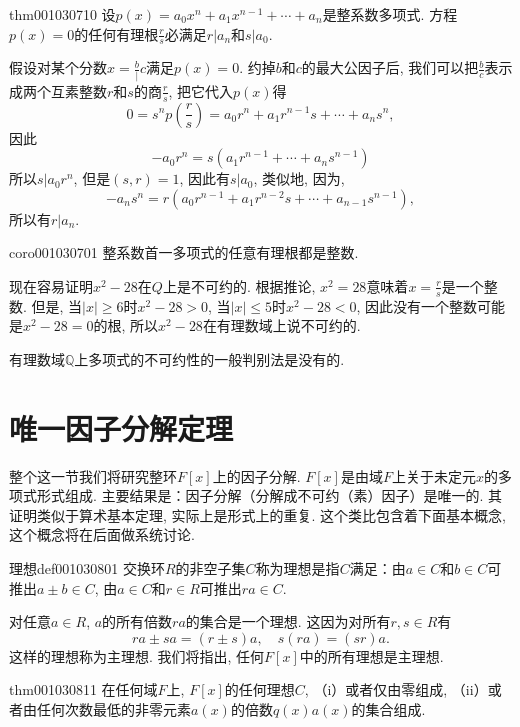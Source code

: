 \begin{theorem}{}{thm001030710}
设$p(x)=a_0x^n+a_1x^{n-1}+\cdots+a_n$是整系数多项式. 方程$p(x)=0$的任何有理根$\frac{r}{s}$必满足$r|a_n$和$s|a_0$. 
\end{theorem}

假设对某个分数$x=\frac{b}|{c}$满足$p(x)=0$. 约掉$b$和$c$的最大公因子后, 我们可以把$\frac{b}{c}$表示成两个互素整数$r$和$s$的商$\frac{r}{s}$, 把它代入$p(x)$得
\begin{equation}\label{equ001030712}
0 = s^np(\frac{r}{s}) = a_0r^n + a_1r^{n-1}s+\cdots+a_ns^n,
\end{equation}
因此
\[
-a_0r^n = s(a_1r^{n-1}+\cdots+a_ns^{n-1})
\]
所以$s|a_0r^n$, 但是$(s, r)=1$, 因此有$s|a_0$, 类似地, 因为, 
\[
-a_ns^n = r(a_0r^{n-1} + a_1r^{n-2}s+\cdots+a_{n-1}s^{n-1}),
\]
所以有$r|a_n$. 

\begin{corollary}{}{coro001030701}
整系数首一多项式的任意有理根都是整数. 
\end{corollary}

现在容易证明$x^2-28$在$Q$上是不可约的. 根据推论, $x^2=28$意味着$x = \frac{r}{s}$是一个整数. 但是, 当$|x| \ge 6$时$x^2-28>0$, 当$|x| \le 5$时$x^2-28<0$, 因此没有一个整数可能是$x^2-28=0$的根, 所以$x^2-28$在有理数域上说不可约的. 

有理数域$\mathbb{Q}$上多项式的不可约性的一般判别法是没有的. 


\section{唯一因子分解定理}\label{subsection0010308}
整个这一节我们将研究整环$F[x]$上的因子分解. $F[x]$是由域$F$上关于未定元$x$的多项式形式组成. 主要结果是：因子分解（分解成不可约（素）因子）是唯一的. 其证明类似于算术基本定理, 实际上是形式上的重复. 这个类比包含着下面基本概念, 这个概念将在后面做系统讨论. 

\begin{definition}{理想}{def001030801}
交换环$R$的非空子集$C$称为理想是指$C$满足：由$a \in C$和$b \in C$可推出$a \pm b \in C$, 由$a \in C$和$r \in R$可推出$ra \in C$. 
\end{definition}

对任意$a \in R$, $a$的所有倍数$ra$的集合是一个理想. 这因为对所有$r, s \in R$有
\[
ra \pm sa = (r \pm s)a, \quad s(ra) = (sr)a.
\]
这样的理想称为主理想. 我们将指出, 任何$F[x]$中的所有理想是主理想. 
\begin{theorem}{}{thm001030811}
在任何域$F$上, $F[x]$的任何理想$C$, （i）或者仅由零组成, （ii）或者由任何次数最低的非零元素$a(x)$的倍数$q(x)a(x)$的集合组成. 
\end{theorem}

